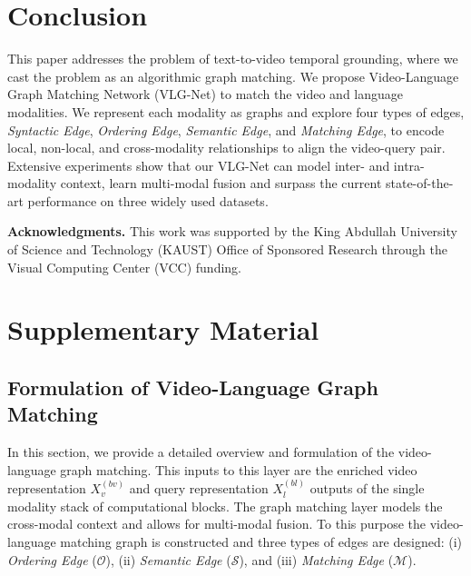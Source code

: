 \documentclass[10pt,twocolumn,letterpaper]{article}
\begin{document}
 \section{Conclusion}\label{sec: conclusions}
This paper addresses the problem of text-to-video temporal grounding, where we cast the problem as an algorithmic graph matching.
We propose Video-Language Graph Matching Network (VLG-Net) to match the video and language modalities. We represent each modality as graphs and explore four types of edges, \textit{Syntactic Edge}, \textit{Ordering Edge}, \textit{Semantic Edge}, and \textit{Matching Edge}, to encode local, non-local, and cross-modality relationships to align the video-query pair. Extensive experiments show that our VLG-Net can model inter- and intra-modality context, learn multi-modal fusion and surpass the current state-of-the-art performance on three widely used datasets. 

\noindent\textbf{Acknowledgments.} This work was supported by the King Abdullah University of Science and Technology (KAUST) Office of Sponsored Research through the Visual Computing Center (VCC) funding. 
{\small


}

\newpage
\section*{Supplementary Material}
\subsection*{Formulation of Video-Language Graph Matching}
In this section, we provide a detailed overview and formulation of the video-language graph matching. 
This inputs to this layer are the enriched video representation $X^{(bv)}_v$ and query representation $X^{(bl)}_l$ outputs of the single modality stack of computational blocks. The graph matching layer models the cross-modal context and allows for multi-modal fusion. To this purpose the video-language matching graph is constructed and three types of edges are designed: (i) \textit{Ordering Edge} ($\mathcal{O}$), (ii) \textit{Semantic Edge} ($\mathcal{S}$), and (iii) \textit{Matching Edge }($\mathcal{M}$).
\end{document}
